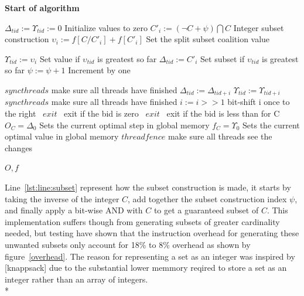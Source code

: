 \documentclass[a4paper, 12pt]{report}
\begin{document}
\textbf{Start of algorithm}
\begin{algorithmic}[1]
\STATE $\Delta _{tid} := \Upsilon _{tid} := 0$ \hfill Initialize values to zero
\IF{$\psi \leq \Psi$} 
\STATE $C'_{i} := (\neg C+\psi) \bigcap C$ \label{lst:line:subset} \hfill Integer subset construction
\STATE $\upsilon _{i} := f[C/C'_{i}]+f[C'_{i}]$ \hfill Set the split subset coalition value
\ENDIF 

\STATE $\Upsilon _{tid} := \upsilon _{i}$  \hfill Set value if $\upsilon _{tid}$ is greatest so far
\STATE $\Delta _{tid} := C'_{i}$ \hfill Set subset if $\upsilon _{tid}$ is greatest so far
\ENDIF
\STATE $\psi := \psi + 1$ \hfill Increment by one
\ENDFOR
\ENDIF

\STATE $syncthreads$ \hfill make sure all threads have finished
 \label{lst:line:mid}
 \label{lst:line:midmid}
 \label{lst:line:midmidmid}
\STATE $\Delta _{tid} := \Delta _{tid+i}$ 
\STATE $\Upsilon _{tid} := \Upsilon _{tid+i}$
\ENDIF
\ENDIF
\STATE $syncthreads$ \hfill make sure all threads have finished
\STATE $i := i >> 1$ \hfill bit-shift i once to the right \label{lst:line:midlast}
\ENDFOR \label{lst:line:midend}
 \label{lst:line:last}
\STATE{} \algorithmicthen\ {$ exit$}
\algorithmicend\ \algorithmicif \hfill exit if the bid is zero
\STATE{} \algorithmicthen\ {$ exit$} 
\algorithmicend\ \algorithmicif \hfill exit if the bid is less than for C
  \label{lst:line:lastmid}
\STATE $O_C = \Delta _0$ \hfill Sets the current optimal step in global memory
\STATE $f_C = \Upsilon _0$ \hfill Sets the current optimal value in global memory
\STATE $threadfence$ \hfill make sure all threads see the changes
\ENDIF 

\ENDIF \label{lst:line:lastend}
\RETURN $O,f$
\end{algorithmic}
Line~\ref{lst:line:subset} represent how the subset construction is made, it starts by taking the inverse of the integer $C$, add together the subset construction index $\psi$, and finally apply a bit-wise AND with $C$ to get a guaranteed subset of $C$. This implementation suffers though from generating subsets of greater cardinality needed, but testing have shown that the instruction overhead for generating these unwanted subsets only account for 18\% to 8\% overhead as shown by figure~\ref{overhead}. The reason for representing a set as an integer was inspired by [knappsack] due to the substantial lower memmory reqired to store a set as an integer rather than an array of integers.\\*
\end{document}
